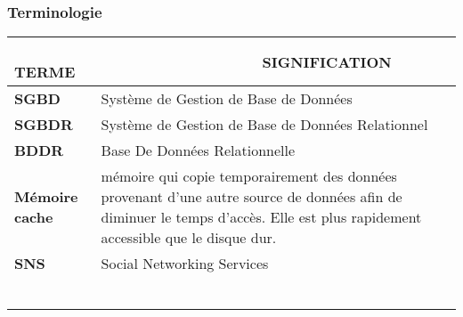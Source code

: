 \newpage

\def\termea{\bf \footnotesize SGBD}
\def\sensa{\footnotesize Système de Gestion de Base de Données}

\def\termeb{\bf \footnotesize SGBDR}
\def\sensb{\footnotesize Système de Gestion de Base de Données Relationnel}

\def\termec{\bf \footnotesize BDD}
\def\sensc{\footnotesize Base De Données}

\def\termec{\bf \footnotesize BDDR}
\def\sensc{\footnotesize Base De Données Relationnelle}

\def\termed{\bf \footnotesize Mémoire cache}
\def\sensd{\footnotesize mémoire qui copie temporairement des données provenant d'une autre source de données afin de diminuer le temps d'accès. Elle est plus rapidement accessible que le disque dur.}

\def\termee{\bf \footnotesize SNS}
\def\sense{\footnotesize Social Networking Services}

\def\termef{\bf \footnotesize }
\def\sensf{\footnotesize }

\def\termeg{\bf \footnotesize }
\def\sensg{\footnotesize }

\def\termeh{\bf \footnotesize }
\def\sensh{\footnotesize }

\def\termei{\bf \footnotesize }
\def\sensi{\footnotesize }

\def\termej{\bf \footnotesize }
\def\sensj{\footnotesize }

\def\termek{\bf \footnotesize }
\def\sensk{\footnotesize }



\begin{center}
\subsubsection*{Terminologie}
\begin{tabular}{|p{5cm}|p{12cm}|}
\hline
{\bf ~~~~~ T{\scriptsize ERME}} & {\bf ~~~~~~~~~~~~~~~~~~~
S{\scriptsize IGNIFICATION}}\\
\hline
\hline
\termea & \sensa\\
\hline
\termeb & \sensb\\
\hline
\termec & \sensc\\
\hline
\termed & \sensd\\
\hline
\termee & \sense\\
\hline
\termef & \sensf\\
\hline
\termeg & \sensg\\
\hline
\termeh & \sensh\\
\hline
\termei & \sensi\\
\hline
\termej & \sensj\\
\hline
\termek & \sensk\\
\hline

\end{tabular}
 
\end{center}
